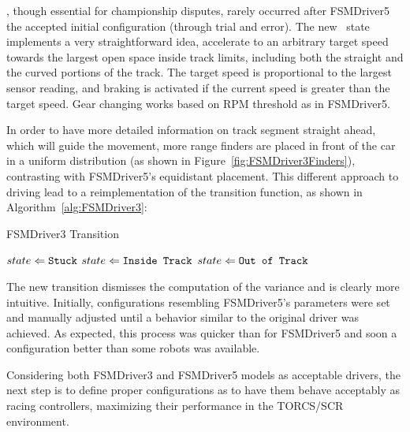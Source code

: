 \recovery, though essential for championship disputes, rarely occurred after FSMDriver5 the accepted initial configuration (through trial and error). The new \racing~state implements a very straightforward idea, accelerate to an arbitrary target speed towards the largest open space inside track limits, including both the straight and the curved portions of the track. The target speed is proportional to the largest sensor reading, and braking is activated if the current speed is greater than the target speed. Gear changing works based on RPM threshold as in FSMDriver5.

In order to have more detailed information on track segment straight ahead, which will guide the movement, more range finders are placed in front of the car in a uniform distribution (as shown in Figure~\ref{fig:FSMDriver3Finders}), contrasting with FSMDriver5's equidistant placement. This different approach to driving lead to a reimplementation of the transition function, as shown in Algorithm~\ref{alg:FSMDriver3}:

\begin{algorithm}[h]%
\caption{FSMDriver3 Transition}%
\label{alg:FSMDriver3}%
\begin{algorithmic}
        \STATE $state \Leftarrow \texttt{Stuck}$
    \ELSE
            \STATE $state \Leftarrow \texttt{Inside Track}$
        \ELSE
            \STATE $state \Leftarrow \texttt{Out of Track}$
        \ENDIF
    \ENDIF
\end{algorithmic}
\end{algorithm}

The new transition dismisses the computation of the variance and is clearly more intuitive. Initially, configurations resembling FSMDriver5's parameters were set and manually adjusted until a behavior similar to the original driver was achieved. As expected, this process was quicker than for FSMDriver5 and soon a configuration better than some robots was available.

Considering both FSMDriver3 and FSMDriver5 models as acceptable drivers, the next step is to define proper configurations as to have them behave acceptably as racing controllers, maximizing their performance in the TORCS/SCR environment.






